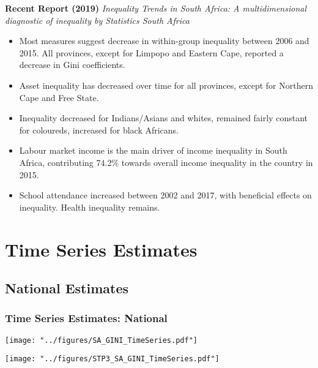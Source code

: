 \documentclass[compress,xcolor=dvipsnames]{beamer}
\newenvironment{noheadline}{
    \setbeamertemplate{headline}{}
    \addtobeamertemplate{frametitle}{\vspace*{-0.9\baselineskip}}{}
}{}
\begin{document}
\begin{frame}
\textbf{Recent Report (2019)} \textit{Inequality Trends in South Africa: A multidimensional diagnostic of inequality  by Statistics South Africa}
\begin{itemize}
\item Most measures suggest decrease in within-group inequality between 2006 and 2015. All provinces, except for Limpopo and Eastern Cape, reported a decrease in Gini coefficients. 
\item Asset inequality has decreased over time for all provinces, except for Northern Cape and Free State.
\item Inequality decreased for Indians/Asians and whites, remained fairly constant for coloureds, increased for black Africans.
\item Labour market income is the main driver of income inequality in South Africa, contributing 74.2\% towards overall income inequality in the country in 2015.
\item School attendance increased between 2002 and 2017, with beneficial effects on inequality. Health inequality remains. 
\end{itemize}
\end{frame}

\section{Time Series Estimates}

\subsection{National Estimates}

\begin{noheadline}
\begin{frame}
\frametitle{Time Series Estimates: National}
\texttt{[image: "../figures/SA\_GINI\_TimeSeries.pdf"]}
\end{frame}
\end{noheadline}

\begin{frame}
\centering
\texttt{[image: "../figures/STP3\_SA\_GINI\_TimeSeries.pdf"]}
\end{frame}
\end{document}
